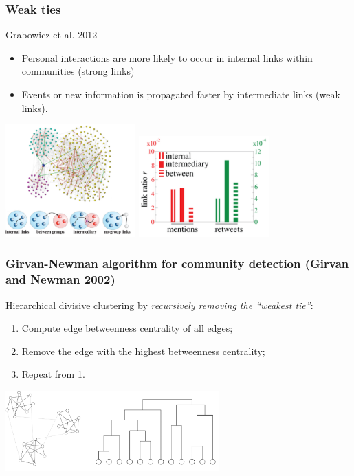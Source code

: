 \begin{frame}
  \frametitle{Weak ties}
  \begin{block}{Grabowicz et al. 2012}
    \begin{itemize}
      \item Personal interactions are more likely to occur in internal links within communities (strong links)
      \item Events or new information is propagated faster by intermediate links (weak links).
    \end{itemize}
  \end{block}
  \includegraphics[width=50mm]{imgs/weak_ties2.pdf}
  \includegraphics[width=50mm]{imgs/weak_ties3.pdf}
\end{frame}

\begin{frame}
  \frametitle{Girvan-Newman algorithm for community detection (Girvan and Newman 2002)}
  Hierarchical divisive clustering by \emph{recursively removing the ``weakest
  tie''}:
  \begin{enumerate}
    \item Compute edge betweenness centrality of all edges;
    \item Remove the edge with the highest betweenness centrality;
    \item Repeat from 1.
  \end{enumerate}
  \centering
  \includegraphics[width=82mm]{imgs/gn.pdf}
\end{frame}

